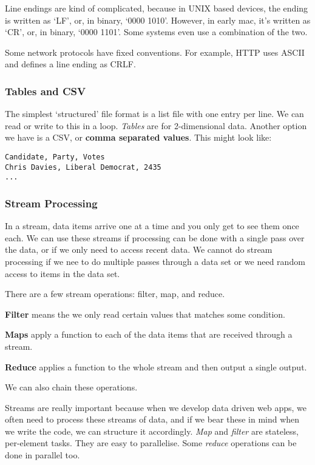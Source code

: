 \documentclass[11pt,a4paper,titlepage,dvipsnames,cmyk]{scrartcl}
\begin{document}
Line endings are kind of complicated, because in UNIX based devices, the
ending is written as `LF', or, in binary, `0000 1010'. However, in early
mac, it's written as `CR', or, in binary, `0000 1101'. Some systems even
use a combination of the two.

Some network protocols have fixed conventions. For example, HTTP
uses ASCII and defines a line ending as CRLF.

\subsubsection{Tables and CSV}%
\label{ssub:tables}
The simplest `structured' file format is a list file with one entry per
line. We can read or write to this in a loop. \textit{Tables} are for
2-dimensional data. Another option we have is a CSV, or \textbf{comma
separated values}. This might look like:

\begin{lstlisting}[]
Candidate, Party, Votes
Chris Davies, Liberal Democrat, 2435
...
\end{lstlisting}

\subsubsection{Stream Processing}%
\label{ssub:stream}
In a stream, data items arrive one at a time and you only get to see them
once each. We can use these streams if processing can be done with a
single pass over the data, or if we only need to access recent data. We
cannot do stream processing if we nee to do multiple passes through a data
set or we need random access to items in the data set.

There are a few stream operations: filter, map, and reduce.

\textbf{Filter} means the we only read certain values that matches some
condition.

\textbf{Maps} apply a function to each of the data items that are received
through a stream.

\textbf{Reduce} applies a function to the whole stream and then output a
single output.

We can also chain these operations.

Streams are really important because when we develop data driven web apps,
we often need to process these streams of data, and if we bear these in
mind when we write the code, we can structure it accordingly. \textit{Map}
and \textit{filter} are stateless, per-element tasks. They are easy to
parallelise. Some \textit{reduce} operations can be done in parallel too. 
\end{document}
